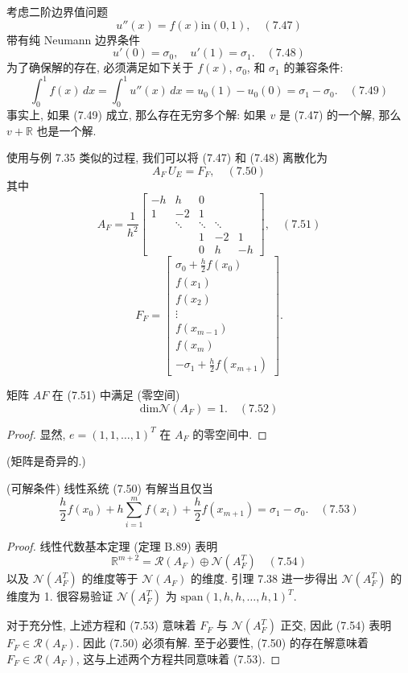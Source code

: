 \documentclass[a4paper]{ctexart}
\newcommand{\hl}[1]
{\noindent {\bf {#1}}}
\begin{document}
\hl{例 7.37} 考虑二阶边界值问题
$$
u''(x) = f(x) \text{in} (0, 1), \quad (7.47)
$$
带有纯 Neumann 边界条件
$$
u'(0) = \sigma_0, \quad u'(1) = \sigma_1. \quad (7.48)
$$
为了确保解的存在, 必须满足如下关于 $f(x)$, $\sigma_0$, 和 $\sigma_1$ 的兼容条件:
$$
\int_{0}^{1} f(x) \, dx = \int_{0}^{1} u''(x) \, dx 
= u_0(1) - u_0(0) = \sigma_1 - \sigma_0. \quad (7.49)
$$
事实上, 如果 (7.49) 成立, 那么存在无穷多个解: 
如果 $v$ 是 (7.47) 的一个解, 那么 $v + \mathbb{R}$ 也是一个解.

使用与例 7.35 类似的过程, 我们可以将 (7.47) 和 (7.48) 离散化为
$$
A_F \, U_E = F_F, \quad (7.50)
$$
其中
$$
A_F = \frac{1}{h^2}
\begin{bmatrix}
-h & h & 0 &  &  \\
1 & -2 & 1 &  &  \\
 & \ddots & \ddots & \ddots & \\
&&1 & -2 & 1 \\
&&0&h & -h
\end{bmatrix}, \quad (7.51)
$$
$$
F_F = \begin{bmatrix}
\sigma_0 + \frac{h}{2}f(x_0) \\
f(x_1) \\
f(x_2) \\
\vdots \\
f(x_{m-1}) \\
f(x_m) \\
-\sigma_1 + \frac{h}{2}f(x_{m+1})
\end{bmatrix}.
$$

\hl{引理 7.38} 矩阵 $AF$ 在 (7.51) 中满足 (零空间)
$$
\mathrm{dim} \mathscr{N}(A_F) = 1. \quad (7.52)
$$

\begin{proof}
显然, $e = (1, 1, \ldots, 1)^T$ 在 $A_F$ 的零空间中. 
\end{proof}
(矩阵是奇异的.)

\hl{定理 7.39}(可解条件) 线性系统 (7.50) 有解当且仅当
$$
\frac{h}{2}f(x_0) 
+ h\sum_{i = 1}^{m} f(x_i) 
+ \frac{h}{2}f(x_{m + 1}) = \sigma_1 - \sigma_0. \quad (7.53)
$$

\begin{proof}
线性代数基本定理 (定理 B.89) 表明
$$
  \mathbb{R}^{m + 2} = \mathscr{R}(A_F) \oplus \mathscr{N}(A_F^T) \quad (7.54)
  $$
以及 $\mathscr{N}(A_F^T)$ 的维度等于 $\mathscr{N}(A_F)$ 的维度. 
引理 7.38 进一步得出 $\mathscr{N}(A_F^T)$ 的维度为 1. 
很容易验证 $\mathscr{N}(A_F^T)$ 为 $\mathrm{span}(1, h, h, \ldots, h, 1)^T$.
  
对于充分性, 上述方程和 (7.53) 意味着 $F_F$ 与 $\mathscr{N}(A_F^T)$ 正交, 
因此 (7.54) 表明 $F_F \in \mathscr{R}(A_F)$. 
因此 (7.50) 必须有解. 至于必要性, (7.50) 的存在解意味着 
$F_F \in \mathscr{R}(A_F)$, 这与上述两个方程共同意味着 (7.53).     
\end{proof}
\end{document}
